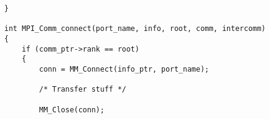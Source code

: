 \documentclass{article}
\begin{document}
\begin{small}
\begin{verbatim}
\end{verbatim}
%
%
%        
%        
%        
%
%        
%        
\begin{verbatim}
}

int MPI_Comm_connect(port_name, info, root, comm, intercomm)
{
    if (comm_ptr->rank == root)
    {
        conn = MM_Connect(info_ptr, port_name);

        /* Transfer stuff */

        MM_Close(conn);


\end{verbatim}
\end{small}
\end{document}
